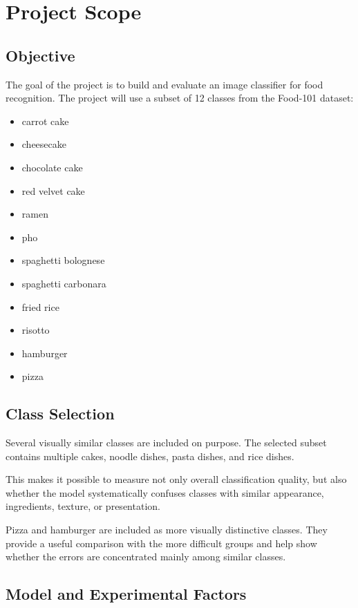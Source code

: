 \documentclass[11pt,a4paper]{article}
\begin{document}
\section{Project Scope}

\subsection{Objective}

The goal of the project is to build and evaluate an image classifier for food recognition.
The project will use a subset of 12 classes from the Food-101 dataset:

\begin{itemize}
    \item carrot cake
    \item cheesecake
    \item chocolate cake
    \item red velvet cake
    \item ramen
    \item pho
    \item spaghetti bolognese
    \item spaghetti carbonara
    \item fried rice
    \item risotto
    \item hamburger
    \item pizza
\end{itemize}

\subsection{Class Selection}

Several visually similar classes are included on purpose. The selected subset contains
multiple cakes, noodle dishes, pasta dishes, and rice dishes.

This makes it possible to measure not only overall classification quality, but also
whether the model systematically confuses classes with similar appearance, ingredients,
texture, or presentation.

Pizza and hamburger are included as more visually distinctive classes. They provide
a useful comparison with the more difficult groups and help show whether the errors
are concentrated mainly among similar classes.

\subsection{Model and Experimental Factors}
\end{document}
